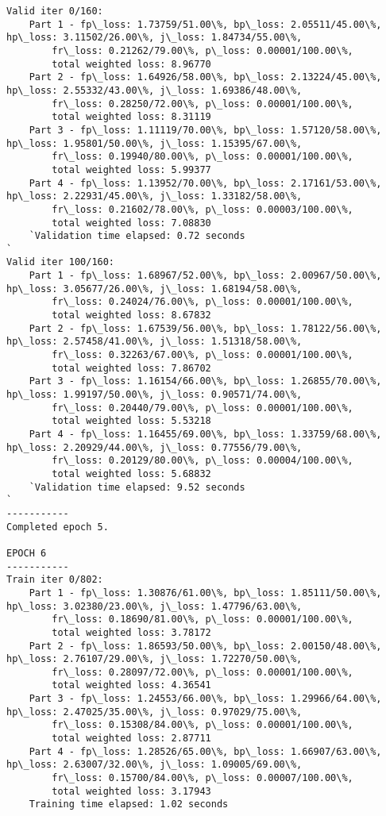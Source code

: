 \documentclass[11pt]{article}
\begin{document}
\begin{Verbatim}[commandchars=\\\{\}]
Valid iter 0/160:
	Part 1 - fp\_loss: 1.73759/51.00\%, bp\_loss: 2.05511/45.00\%, hp\_loss: 3.11502/26.00\%, j\_loss: 1.84734/55.00\%, 
		fr\_loss: 0.21262/79.00\%, p\_loss: 0.00001/100.00\%, 
		total weighted loss: 8.96770
	Part 2 - fp\_loss: 1.64926/58.00\%, bp\_loss: 2.13224/45.00\%, hp\_loss: 2.55332/43.00\%, j\_loss: 1.69386/48.00\%, 
		fr\_loss: 0.28250/72.00\%, p\_loss: 0.00001/100.00\%, 
		total weighted loss: 8.31119
	Part 3 - fp\_loss: 1.11119/70.00\%, bp\_loss: 1.57120/58.00\%, hp\_loss: 1.95801/50.00\%, j\_loss: 1.15395/67.00\%, 
		fr\_loss: 0.19940/80.00\%, p\_loss: 0.00001/100.00\%, 
		total weighted loss: 5.99377
	Part 4 - fp\_loss: 1.13952/70.00\%, bp\_loss: 2.17161/53.00\%, hp\_loss: 2.22931/45.00\%, j\_loss: 1.33182/58.00\%, 
		fr\_loss: 0.21602/78.00\%, p\_loss: 0.00003/100.00\%, 
		total weighted loss: 7.08830
	`Validation time elapsed: 0.72 seconds
`
Valid iter 100/160:
	Part 1 - fp\_loss: 1.68967/52.00\%, bp\_loss: 2.00967/50.00\%, hp\_loss: 3.05677/26.00\%, j\_loss: 1.68194/58.00\%, 
		fr\_loss: 0.24024/76.00\%, p\_loss: 0.00001/100.00\%, 
		total weighted loss: 8.67832
	Part 2 - fp\_loss: 1.67539/56.00\%, bp\_loss: 1.78122/56.00\%, hp\_loss: 2.57458/41.00\%, j\_loss: 1.51318/58.00\%, 
		fr\_loss: 0.32263/67.00\%, p\_loss: 0.00001/100.00\%, 
		total weighted loss: 7.86702
	Part 3 - fp\_loss: 1.16154/66.00\%, bp\_loss: 1.26855/70.00\%, hp\_loss: 1.99197/50.00\%, j\_loss: 0.90571/74.00\%, 
		fr\_loss: 0.20440/79.00\%, p\_loss: 0.00001/100.00\%, 
		total weighted loss: 5.53218
	Part 4 - fp\_loss: 1.16455/69.00\%, bp\_loss: 1.33759/68.00\%, hp\_loss: 2.20929/44.00\%, j\_loss: 0.77556/79.00\%, 
		fr\_loss: 0.20129/80.00\%, p\_loss: 0.00004/100.00\%, 
		total weighted loss: 5.68832
	`Validation time elapsed: 9.52 seconds
`
-----------
Completed epoch 5.

EPOCH 6
-----------
Train iter 0/802:
	Part 1 - fp\_loss: 1.30876/61.00\%, bp\_loss: 1.85111/50.00\%, hp\_loss: 3.02380/23.00\%, j\_loss: 1.47796/63.00\%, 
		fr\_loss: 0.18690/81.00\%, p\_loss: 0.00001/100.00\%, 
		total weighted loss: 3.78172
	Part 2 - fp\_loss: 1.86593/50.00\%, bp\_loss: 2.00150/48.00\%, hp\_loss: 2.76107/29.00\%, j\_loss: 1.72270/50.00\%, 
		fr\_loss: 0.28097/72.00\%, p\_loss: 0.00001/100.00\%, 
		total weighted loss: 4.36541
	Part 3 - fp\_loss: 1.24553/66.00\%, bp\_loss: 1.29966/64.00\%, hp\_loss: 2.47025/35.00\%, j\_loss: 0.97029/75.00\%, 
		fr\_loss: 0.15308/84.00\%, p\_loss: 0.00001/100.00\%, 
		total weighted loss: 2.87711
	Part 4 - fp\_loss: 1.28526/65.00\%, bp\_loss: 1.66907/63.00\%, hp\_loss: 2.63007/32.00\%, j\_loss: 1.09005/69.00\%, 
		fr\_loss: 0.15700/84.00\%, p\_loss: 0.00007/100.00\%, 
		total weighted loss: 3.17943
	Training time elapsed: 1.02 seconds


\end{Verbatim}
\end{document}
